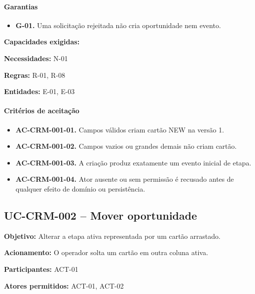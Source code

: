 \documentclass[10pt,a4paper]{article}
\begin{document}
\paragraph{Garantias}

\begin{itemize}

\item \textbf{G-01.} Uma solicitação rejeitada não cria oportunidade nem evento.

\end{itemize}

\textbf{Capacidades exigidas:} 

\textbf{Necessidades:} N-01

\textbf{Regras:} R-01, R-08

\textbf{Entidades:} E-01, E-03

\paragraph{Critérios de aceitação}

\begin{itemize}

\item \textbf{AC-CRM-001-01.} Campos válidos criam cartão NEW na versão 1.

\item \textbf{AC-CRM-001-02.} Campos vazios ou grandes demais não criam cartão.

\item \textbf{AC-CRM-001-03.} A criação produz exatamente um evento inicial de etapa.

\item \textbf{AC-CRM-001-04.} Ator ausente ou sem permissão é recusado antes de qualquer efeito de domínio ou persistência.

\end{itemize}

\subsection{UC-CRM-002 -- Mover oportunidade}

\textbf{Objetivo:} Alterar a etapa ativa representada por um cartão arrastado.

\textbf{Acionamento:} O operador solta um cartão em outra coluna ativa.

\textbf{Participantes:} ACT-01

\textbf{Atores permitidos:} ACT-01, ACT-02
\end{document}
